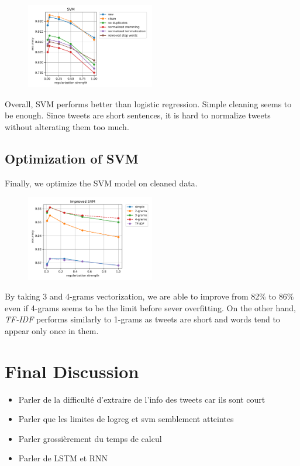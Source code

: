 \documentclass[11pt, a4paper, twocolumn]{article}
\begin{document}
\begin{figure}[h]
	\includegraphics[width=0.5\textwidth]{../plots/svm.png}
\end{figure}

Overall, SVM performs better than logistic regression. Simple cleaning seems to be enough. Since tweets are short sentences, it is hard to normalize tweets without alterating them too much.

\subsection{Optimization of SVM}
Finally, we optimize the SVM model on cleaned data.

\begin{figure}[h]
	\includegraphics[width=0.5\textwidth]{../plots/improved_svm.png}
\end{figure}

By taking 3 and 4-grams vectorization, we are able to improve from 82\% to 86\% even if 4-grams seems to be the limit before sever overfitting. On the other hand, \textit{TF-IDF} performs similarly to 1-grams as tweets are short and words tend to appear only once in them.

\section{Final Discussion}
\begin{itemize}
	\item Parler de la difficulté d'extraire de l'info des tweets car ils sont court
	\item Parler que les limites de logreg et svm semblement atteintes
	\item Parler grossièrement du temps de calcul
	\item Parler de LSTM et RNN
\end{itemize}
\end{document}
